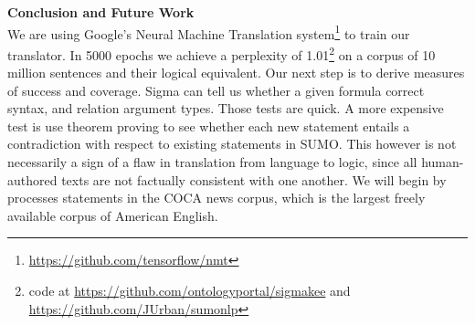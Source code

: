 \documentclass{easychair}
\begin{document}
\noindent\textbf{Conclusion and Future Work}\\
\indent We are using Google's Neural Machine Translation system\footnote{\url{https://github.com/tensorflow/nmt}}
to train our translator.  In 5000 epochs we achieve a perplexity of 1.01\footnote{code at \url{https://github.com/ontologyportal/sigmakee} and \url{https://github.com/JUrban/sumonlp}}
on a corpus of 10 million sentences and their logical equivalent. Our next step is to derive measures of success and coverage.  Sigma can tell us whether a given formula correct syntax, and relation argument types.
Those tests are quick.  A more expensive test is use theorem proving to see whether each new statement
entails a contradiction with respect to existing statements in SUMO.  This however is not necessarily a 
sign of a flaw in translation from language to logic, since all human-authored texts are not factually
consistent with one another.  We will begin by processes statements in the COCA news corpus, which is
the largest freely available corpus of American English.
 
 
\label{sect:bib}

%
%
%

\end{document}
